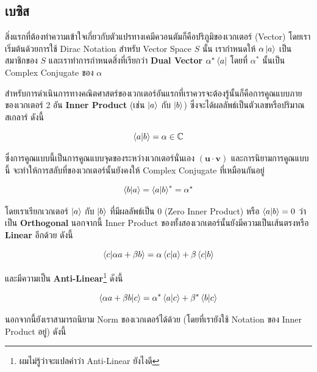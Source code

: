 \subsection{เบซิส}

สิ่งแรกที่ต้องทำความเข้าใจเกี่ยวกับตัวแปรทางเคมีควอนตัมก็คือปริภูมิของเวกเตอร์ (Vector) โดยเราเริ่มต้นด้วยการใช้ Dirac Notation
สำหรับ Vector Space $S$ นั้น เรากำหนดให้ $\alpha \ket{a}$ เป็นสมาชิกของ $S$ และเราทำการกำหนดสิ่งที่เรียกว่า \textbf{Dual
  Vector} $\alpha^* \bra{a}$ โดยที่ $\alpha^*$ นั้นเป็น Complex Conjugate ของ $\alpha$

สำหรับการดำเนินการทางคณิตศาสตร์ของเวกเตอร์อันแรกที่เราควรจะต้องรู้นั้นก็คือการคูณแบบภายของเวกเตอร์ 2 อัน \textbf{Inner Product}
(เช่น $\ket{a}$ กับ $\ket{b}$) ซึ่งจะได้ผลลัพธ์เป็นตัวเลขหรือปริมาณสเกลาร์ ดังนี้

\begin{equation}
  \braket{a}{b}
  =
  \alpha \in \mathbb{C}
\end{equation}

\noindent ซึ่งการคูณแบบนี้เป็นการคูณแบบจุดของระหว่างเวกเตอร์นั่นเอง $(\bm{u} \cdot \bm{v})$ และการนิยามการคูณแบบนี้%
จะทำให้การสลับที่ของเวกเตอร์นั้นยังคงให้ Complex Conjugate ที่เหมือนกันอยู่

\begin{equation}
  \label{eq:braket_conjugate}
  \braket{b}{a}
  =
  \braket{a}{b}^*
  = \alpha^*
\end{equation}

\noindent โดยเราเรียกเวกเตอร์ $\ket{a}$ กับ $\ket{b}$ ที่มีผลลัพธ์เป็น 0 (Zero Inner Product) หรือ $ \braket{a}{b} = 0$
ว่าเป็น \textbf{Orthogonal} นอกจากนี้ Inner Product ของทั้งสองเวกเตอร์นั้นยังมีความเป็นเส้นตรงหรือ \textbf{Linear} อีกด้วย ดังนี้

\begin{equation}
  \braket{c}{\alpha a + \beta b}
  =
  \alpha \braket{c}{a} + \beta \braket{c}{b}
\end{equation}

\noindent และมีความเป็น \textbf{Anti-Linear}\footnote{ผมไม่รู้ว่าจะแปลคำว่า Anti-Linear ยังไงดี} ดังนี้

\begin{equation}
  \braket{\alpha a + \beta b}{c}
  =
  \alpha^* \braket{a}{c} + \beta^* \braket{b}{c}
\end{equation}

นอกจากนี้ยังเราสามารถนิยาม Norm ของเวกเตอร์ได้ด้วย (โดยที่เรายังใช้ Notation ของ Inner Product อยู่) ดังนี้

